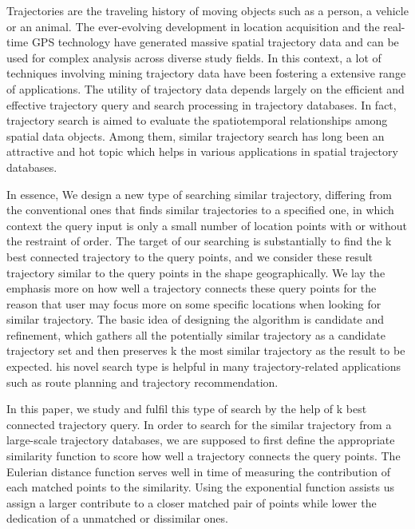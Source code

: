 \begin{bigabstract}
Trajectories are the traveling history of moving objects such as a person, a vehicle or an animal. The ever-evolving development in location acquisition and the real-time GPS technology have generated massive spatial trajectory data and can be used for complex analysis across diverse study fields. In this context, a lot of techniques involving mining trajectory data have been fostering a extensive range of applications. The utility of trajectory data depends largely on the efficient and effective trajectory query and search processing in trajectory databases. In fact, trajectory search is aimed to evaluate the spatiotemporal relationships among spatial data objects. Among them, similar trajectory search has long been an attractive and hot topic which helps in various applications in spatial trajectory databases. 

In essence, We design a new type of searching similar trajectory, differing from the conventional ones that finds similar trajectories to a specified one, in which context the query input is only a small number of location points with or without the restraint of order. The target of our searching is substantially to find the k best connected trajectory to the query points, and we consider these result trajectory similar to the query points in the shape geographically. We lay the emphasis more on how well a trajectory connects these query points for the reason that user may focus more on some specific locations when looking for similar trajectory. The basic idea of designing the algorithm is candidate and refinement, which gathers all the potentially similar trajectory as a candidate trajectory set and then preserves k the most similar trajectory as the result to be expected. his novel search type is helpful in many trajectory-related applications such as route planning and trajectory recommendation.

In this paper, we study and fulfil this type of search by the help of k best connected trajectory query. In order to search for the similar trajectory from a large-scale trajectory databases, we are supposed to first define the appropriate similarity function to score how well a trajectory connects the query points. The Eulerian distance function serves well in time of measuring the contribution of each matched points to the similarity. Using the exponential function assists us assign a larger contribute to a closer matched pair of points while lower the dedication of a unmatched or dissimilar ones.


\end{bigabstract}
